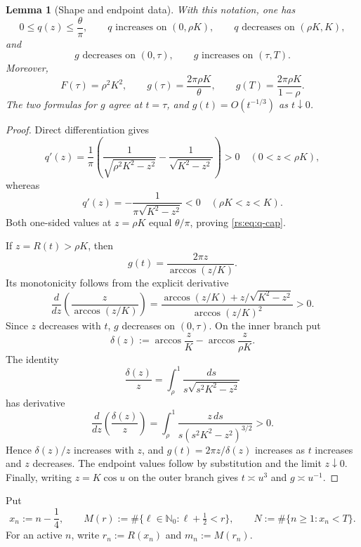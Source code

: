 \documentclass[11pt]{article}
\newtheorem{lemma}[theorem]{Lemma}
\theoremstyle{remark}
\begin{document}
\begin{lemma}[Shape and endpoint data]
\label{rs:lem:shape}
With this notation, one has
\begin{equation}
 0\leq q(z)\leq\frac{\theta}{\pi},
 \qquad
 q\text{ increases on }(0,\rho K),
 \qquad q\text{ decreases on }(\rho K,K),
 \label{rs:eq:q-cap}
\end{equation}
and
\begin{equation}
 g\text{ decreases on }(0,\tau),
 \qquad g\text{ increases on }(\tau,T).
 \label{rs:eq:g-shape}
\end{equation}
Moreover,
\begin{equation}
 F(\tau)=\rho^2K^2,
 \qquad
 g(\tau)=\frac{2\pi\rho K}{\theta},
 \qquad
 g(T)=\frac{2\pi\rho K}{1-\rho}.
 \label{rs:eq:g-data}
\end{equation}
The two formulas for $g$ agree at $t=\tau$, and
$g(t)=O(t^{-1/3})$ as $t\downarrow0$.
\end{lemma}

\begin{proof}
Direct differentiation gives
\[
 q'(z)=\frac1\pi\left(
 \frac1{\sqrt{\rho^2K^2-z^2}}-
 \frac1{\sqrt{K^2-z^2}}\right)>0
 \quad(0<z<\rho K),
\]
whereas
\[
 q'(z)=-\frac1{\pi\sqrt{K^2-z^2}}<0
 \quad(\rho K<z<K).
\]
Both one-sided values at $z=\rho K$ equal $\theta/\pi$, proving
\eqref{rs:eq:q-cap}.

If $z=R(t)>\rho K$, then
\[
 g(t)=\frac{2\pi z}{\arccos(z/K)}.
\]
Its monotonicity follows from the explicit derivative
\[
 \frac{d}{dz}\left(\frac{z}{\arccos(z/K)}\right)
 =\frac{\arccos(z/K)+z/\sqrt{K^2-z^2}}
        {\arccos(z/K)^2}>0.
\]
Since $z$ decreases with $t$, $g$ decreases on $(0,\tau)$.  On the inner
branch put
\[
 \delta(z):=\arccos\frac zK-\arccos\frac z{\rho K}.
\]
The identity
\[
\frac{\delta(z)}z
 =\int_\rho^1\frac{ds}{s\sqrt{s^2K^2-z^2}}
\]
has derivative
\[
 \frac{d}{dz}\left(\frac{\delta(z)}z\right)
 =\int_\rho^1
 \frac{z\,ds}{s(s^2K^2-z^2)^{3/2}}>0.
\]
Hence $\delta(z)/z$ increases with $z$, and
$g(t)=2\pi z/\delta(z)$ increases as $t$ increases and $z$ decreases.
The endpoint values follow by substitution and the limit $z\downarrow0$.
Finally, writing $z=K\cos u$ on the outer branch gives
$t\asymp u^3$ and $g\asymp u^{-1}$.
\end{proof}

Put
\begin{equation}
 x_n:=n-\frac14,
 \qquad
 M(r):=\#\{\ell\in\mathbb N_0:\ell+\tfrac12<r\},
 \qquad
 N:=\#\{n\geq1:x_n<T\}.
 \label{rs:eq:grids}
\end{equation}
For an active $n$, write $r_n:=R(x_n)$ and $m_n:=M(r_n)$.
\end{document}
